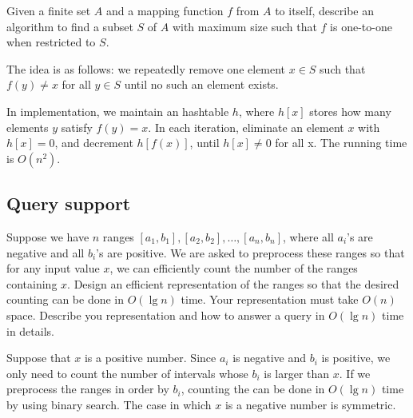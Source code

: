 \begin{Exercise}
Given a finite set $A$ and a mapping function $f$ from $A$ to itself, describe an algorithm to find a subset $S$ of $A$ with maximum size such that $f$ is one-to-one when restricted to $S$.
\end{Exercise}
\begin{Answer}
The idea is as follows: we repeatedly remove one element $x \in S$ such that $f(y) \neq x$ for all $y \in S$ until no such an element exists.

In implementation, we maintain an hashtable $h$, where $h[x]$ stores how many elements $y$ satisfy $f(y) = x$. In each iteration, eliminate an element $x$ with $h[x] = 0$, and decrement $h[f(x)]$, until $h[x] \neq 0$ for all x. The running time is $O(n^2)$.
\end{Answer}

\subsection{Query support}

\begin{Exercise}
Suppose we have $n$ ranges $[a_1, b_1], [a_2, b_2], \dots, [a_n, b_n]$, where all $a_i$'s are negative and all $b_i$'s are positive. We are asked to preprocess these ranges so that for any input value $x$, we can efficiently count the number of the ranges containing $x$. Design an efficient representation of the ranges so that the desired counting can be done in $O(\lg n)$ time. Your representation must take $O(n)$ space. Describe you representation and how to answer a query in $O(\lg n)$ time in details. 
\end{Exercise}
\begin{Answer}
Suppose that $x$ is a positive number. Since $a_i$ is negative and $b_i$ is positive, we only need to count the number of intervals whose $b_i$ is larger than $x$. If we preprocess the ranges in order by $b_i$, counting the can be done in $O(\lg n)$ time by using binary search. The case in which $x$ is a negative number is symmetric.
\end{Answer}

